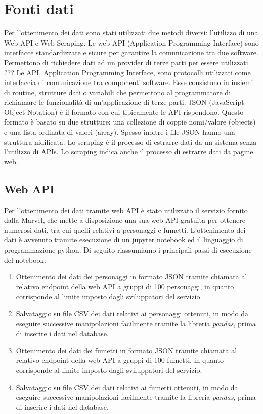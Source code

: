 \documentclass[
12pt, %
a4paper, %
oneside, %
headinclude,footinclude, %
BCOR5mm, %
]{scrartcl}
\begin{document}

\section{Fonti dati}
Per l'ottenimento dei dati sono stati utilizzati due metodi diversi: l'utilizzo di una Web API e Web Scraping.
Le web API (Application Programming Interface) sono interfacce standardizzate e sicure per garantire la comunicazione
tra due software. Permettono di richiedere dati ad un provider di terze parti per essere utilizzati. ???
Le API, Application Programming Interface, sono protocolli utilizzati come interfaccia di comunicazione tra componenti software. Esse consistono in insiemi di routine, strutture dati o variabili che permettono al programmatore di richiamare le funzionalità di un’applicazione di terze parti. \cite{BigDataBook}
JSON (JavaScript Object Notation) è il formato con cui tipicamente le API rispondono. Questo formato è basato su due strutture: una collezione di coppie nomi/valore (objects) e una lista ordinata di valori (array). Spesso inoltre i file JSON hanno una struttura nidificata.
Lo scraping è il processo di estrarre dati da un sistema senza l'utilizzo di APIs. Lo scraping indica anche il processo di estrarre dati da pagine web.

\subsection{Web API}
Per l'ottenimento dei dati tramite web API è stato utilizzato il servizio fornito dalla Marvel, che mette a disposizione una sua web API gratuita per ottenere numerosi dati, tra cui quelli relativi a personaggi e fumetti.
L'ottenimento dei dati è avvenuto tramite esecuzione di un jupyter notebook ed il linguaggio di programmazione python.
Di seguito riassumiamo i principali passi di esecuzione del notebook:
\begin{enumerate}
\item Ottenimento dei dati dei personaggi in formato JSON tramite chiamata al relativo endpoint della web API a gruppi di 100 personaggi, in quanto corrisponde al limite imposto dagli sviluppatori del servizio.
\item Salvataggio su file CSV dei dati relativi ai personaggi ottenuti, in modo da eseguire successive manipolazioni facilmente tramite la libreria \textit{pandas}, prima di inserire i dati nel database.
\item Ottenimento dei dati dei fumetti in formato JSON tramite chiamata al relativo endpoint della web API a gruppi di 100 fumetti, in quanto corrisponde al limite imposto dagli sviluppatori del servizio.
\item Salvataggio su file CSV dei dati relativi ai fumetti ottenuti, in modo da eseguire successive manipolazioni facilmente tramite la libreria \textit{pandas}, prima di inserire i dati nel database.
\end{enumerate}
\end{document}
